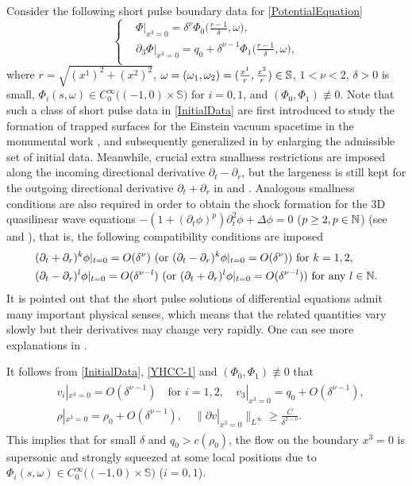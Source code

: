 \documentclass[11pt,twoside]{article}
\def\f{\frac}
\def\p{\partial}
\begin{document}
Consider the following  short pulse boundary data for \eqref{PotentialEquation}
\begin{equation}\label{InitialData}
\left\{
\begin{aligned}
&\Phi|_{x^3 = 0} = \delta^\nu \Phi_0\big(\frac{r-1}{\delta}, \omega\big), \\
&\partial_3\Phi|_{x^3 =0} = q_0 + \delta^{\nu - 1} \Phi_1\big(\frac{r-1}{\delta}, \omega\big),\\
\end{aligned}
\right.
\end{equation}
where $r=\sqrt{(x^1)^2 + (x^2)^2}$, $\omega=(\omega_1,\omega_2)=(\f{x^1}{r}, \f{x^2}{r})\in\Bbb S$, $1<\nu<2$,
$\delta>0$ is small,  \( \Phi_i(s, \omega) \in C_0^\infty\big((-1, 0) \times \mathbb{S}\big) \)
for \( i = 0, 1 \), and $(\Phi_0, \Phi_1)\not\equiv0$. Note that such a class of short pulse data
in \eqref{InitialData} are first introduced
to study the formation of trapped surfaces for the Einstein vacuum spacetime in the monumental work \cite{Ch2},
and subsequently generalized in \cite{K-R} by enlarging the admissible set of initial data.
Meanwhile, crucial extra smallness restrictions are imposed along the incoming directional  derivative $\p_t-\p_r$,
but the largeness is still kept for the outgoing directional derivative
$\p_t+\p_r$ in \cite{Ch2} and \cite{K-R}. Analogous smallness conditions are also required
in order to obtain the shock formation for the 3D quasilinear wave equations $-(1+(\p_t\phi)^p)\p_t^2\phi+\Delta\phi=0$
($p\ge 2, p\in\Bbb N$) (see \cite{M-Y} and \cite{L-Y}), that is, the following  compatibility conditions are imposed
\begin{equation}\label{YHCCC-1}
\begin{split}
&(\p_t+\p_r)^k\phi|_{t=0}=O(\delta^\nu)\ \text{(or}\ (\p_t-\p_r)^k\phi|_{t=0}=O(\delta^\nu)) \ \text{for}\  k=1,2,\\
&(\p_t-\p_r)^l\phi|_{t=0}=O(\delta^{\nu-l})\ \text{(or }(\p_t+\p_r)^l\phi|_{t=0}
=O(\delta^{\nu-l})\text{)}\   \text{for any}\ l\in\Bbb N.
\end{split}	
\end{equation}
It is pointed out that the short pulse solutions of differential
equations admit many important physical senses, which means that the related  quantities vary slowly
but their derivatives may change very rapidly. One can see more explanations in \cite{Alt1, Alt2, Hunter, Majda}.

It follows from \eqref{InitialData}, \eqref{YHCC-1} and $(\Phi_0, \Phi_1)\not\equiv0$ that
\begin{align}\label{YHCCC-2}
\begin{split}
&v_i|_{x^3=0}=O(\delta^{\nu-1})\quad\text{for $i=1,2$},\quad
v_3|_{x^3=0}=q_0+O(\delta^{\nu-1}),\\
&\rho|_{x^3=0}=\rho_0+O(\delta^{\nu-1}),\quad
\|\p v|_{x^3=0}\|_{L^\infty}\ge \f{C}{\delta^{2-\nu}}.
\end{split}
\end{align}
This implies that for small $\delta$ and $q_0>c(\rho_0)$, the flow on the boundary $x^3=0$ is supersonic
and strongly squeezed at some local positions due to $\Phi_i(s, \omega) \in C_0^\infty\big((-1, 0) \times \mathbb{S}\big)$
($i= 0, 1$).
\end{document}
